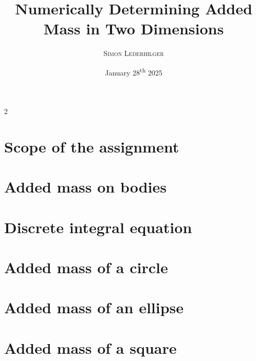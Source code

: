 \documentclass{article}
\title{Numerically Determining Added Mass in Two Dimensions}
\subtitle{\textit{\headcourse}}
\author{\textsc{Simon Lederhilger}}
\date{January 28\textsuperscript{th} 2025}
\begin{document}
\maketitle\thispagestyle{fancy}
\begin{multicols*}{2}
  \section[Scope]{Scope of the assignment}
  \begingroup\endgroup
  
  \section[Added mass]{Added mass on bodies}
  \begingroup\endgroup

  \section[Discrete form]{Discrete integral equation}
  \begingroup\endgroup

  \section[Circle]{Added mass of a circle}
  \begingroup\endgroup

  \section[Ellipse]{Added mass of an ellipse}
  \begingroup\endgroup

  \section[Square]{Added mass of a square}
  \begingroup\endgroup

  \printbibliography
\end{multicols*}
\end{document}
